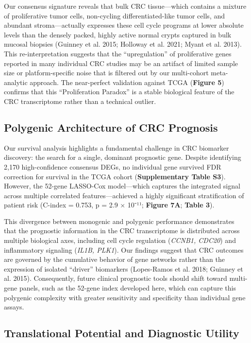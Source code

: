 \documentclass[
  12pt,
]{article}
\begin{document}
Our consensus signature reveals that bulk CRC tissue---which contains a
mixture of proliferative tumor cells, non-cycling differentiated-like
tumor cells, and abundant stroma---actually expresses these cell cycle
programs at lower absolute levels than the densely packed, highly active
normal crypts captured in bulk mucosal biopsies (Guinney et al. 2015;
Holloway et al. 2021; Myant et al. 2013). This re-interpretation
suggests that the ``upregulation'' of proliferative genes reported in
many individual CRC studies may be an artifact of limited sample size or
platform-specific noise that is filtered out by our multi-cohort
meta-analytic approach. The near-perfect validation against TCGA
(\textbf{Figure 5}) confirms that this ``Proliferation Paradox'' is a
stable biological feature of the CRC transcriptome rather than a
technical outlier.

\subsection{Polygenic Architecture of CRC
Prognosis}\label{polygenic-architecture-of-crc-prognosis}

Our survival analysis highlights a fundamental challenge in CRC
biomarker discovery: the search for a single, dominant prognostic gene.
Despite identifying 2,170 high-confidence consensus DEGs, no individual
gene survived FDR correction for survival in the TCGA cohort
(\textbf{Supplementary Table S3}). However, the 52-gene LASSO-Cox
model---which captures the integrated signal across multiple correlated
features---achieved a highly significant stratification of patient risk
(C-index = 0.753, p = 2.9 × 10⁻¹¹; \textbf{Figure 7A}; \textbf{Table
3}).

This divergence between monogenic and polygenic performance demonstrates
that the prognostic information in the CRC transcriptome is distributed
across multiple biological axes, including cell cycle regulation
(\emph{CCNB1, CDC20}) and inflammatory signaling (\emph{IL1B, PLK1}).
Our findings suggest that CRC outcomes are governed by the cumulative
behavior of gene networks rather than the expression of isolated
``driver'' biomarkers (Lopes-Ramos et al. 2018; Guinney et al. 2015).
Consequently, future clinical prognostic tools should shift toward
multi-gene panels, such as the 52-gene index developed here, which can
capture this polygenic complexity with greater sensitivity and
specificity than individual gene assays.

\subsection{Translational Potential and Diagnostic
Utility}\label{translational-potential-and-diagnostic-utility}
\end{document}
